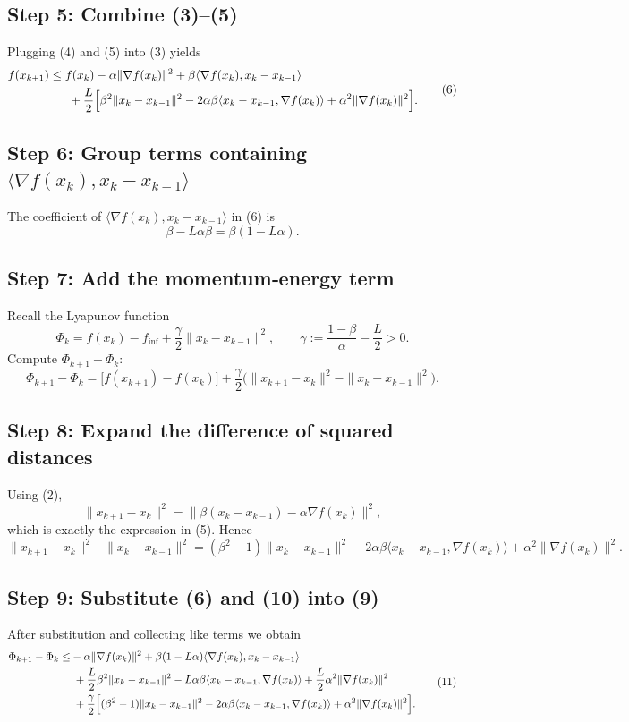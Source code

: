 \documentclass{article}
\newcommand{\grad}{\nabla}
\begin{document}
\subsection*{Step 5: Combine (3)–(5)}
Plugging (4) and (5) into (3) yields
\[
\begin{aligned}
f(x_{k+1}) \le {} & f(x_k)
- \alpha\|\grad f(x_k)\|^2
+ \beta\langle \grad f(x_k),x_k-x_{k-1}\rangle \\
&\; + \frac{L}{2}\Bigl[
    \beta^2\|x_k-x_{k-1}\|^2
    -2\alpha\beta\langle x_k-x_{k-1},\grad f(x_k)\rangle
    +\alpha^2\|\grad f(x_k)\|^2
\Bigr].
\end{aligned}
\tag{6}
\]

\subsection*{Step 6: Group terms containing $\langle \grad f(x_k),x_k-x_{k-1}\rangle$}
The coefficient of $\langle \grad f(x_k),x_k-x_{k-1}\rangle$ in (6) is
\[
\beta - L\alpha\beta = \beta(1-L\alpha).
\tag{7}
\]

\subsection*{Step 7: Add the momentum‑energy term}
Recall the Lyapunov function
\[
\Phi_k = f(x_k)-f_{\inf} + \frac{\gamma}{2}\|x_k-x_{k-1}\|^2,
\qquad
\gamma:=\frac{1-\beta}{\alpha}-\frac{L}{2}>0.
\tag{8}
\]
Compute $\Phi_{k+1}-\Phi_k$:
\[
\Phi_{k+1}-\Phi_k
= \bigl[f(x_{k+1})-f(x_k)\bigr]
  + \frac{\gamma}{2}\bigl(\|x_{k+1}-x_k\|^2-\|x_k-x_{k-1}\|^2\bigl).
\tag{9}
\]

\subsection*{Step 8: Expand the difference of squared distances}
Using (2),
\[
\|x_{k+1}-x_k\|^2 = \|\beta (x_k-x_{k-1}) - \alpha \grad f(x_k)\|^2,
\]
which is exactly the expression in (5). Hence
\[
\|x_{k+1}-x_k\|^2-\|x_k-x_{k-1}\|^2
= (\beta^2-1)\|x_k-x_{k-1}\|^2
  -2\alpha\beta\langle x_k-x_{k-1},\grad f(x_k)\rangle
  +\alpha^2\|\grad f(x_k)\|^2.
\tag{10}
\]

\subsection*{Step 9: Substitute (6) and (10) into (9)}
After substitution and collecting like terms we obtain
\[
\begin{aligned}
\Phi_{k+1}-\Phi_k \le &
-\alpha\|\grad f(x_k)\|^2
+ \beta(1-L\alpha)\langle \grad f(x_k),x_k-x_{k-1}\rangle \\
&\; + \frac{L}{2}\beta^2\|x_k-x_{k-1}\|^2
   -L\alpha\beta\langle x_k-x_{k-1},\grad f(x_k)\rangle
   +\frac{L}{2}\alpha^2\|\grad f(x_k)\|^2 \\
&\; +\frac{\gamma}{2}\Bigl[(\beta^2-1)\|x_k-x_{k-1}\|^2
   -2\alpha\beta\langle x_k-x_{k-1},\grad f(x_k)\rangle
   +\alpha^2\|\grad f(x_k)\|^2\Bigr].
\end{aligned}
\tag{11}
\]
\end{document}
